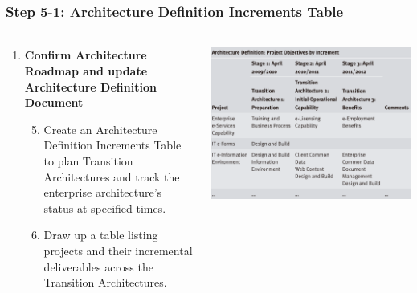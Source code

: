 \documentclass[aspectratio=169, table]{beamer}
\begin{document}
\begin{frame}
	\frametitle{Step 5-1: Architecture Definition Increments Table}
	\framesubtitle{\hspace{1cm}}
\vspace{25pt}
\begin{columns}[onlytextwidth]
	\begin{column}{0.45\textwidth}
		\begin{enumerate}
			\item \textbf{Confirm Architecture Roadmap and update Architecture Definition Document}
			\begin{enumerate}
				\setcounter{enumi}{4}
				\item Create an Architecture Definition Increments Table to plan Transition Architectures and track the enterprise architecture's status at specified times.
				\item Draw up a table listing projects and their incremental deliverables across the Transition Architectures.
			\end{enumerate}
		\end{enumerate}
	\end{column}
	\begin{column}{0.55\textwidth}
		\includegraphics[width=\textwidth]{../figures/architecture_definition_increments.png}
	\end{column}
\end{columns}

\end{frame}

			
\end{document}
